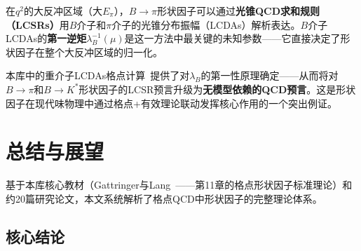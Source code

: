 \documentclass[12pt,a4paper]{ctexart}
\theoremstyle{definition}
\begin{document}
在$q^2$的大反冲区域（大$E_\pi$），$B \to \pi$形状因子可以通过\textbf{光锥QCD求和规则（LCSRs）}用$B$介子和$\pi$介子的光锥分布振幅（LCDAs）解析表达。$B$介子LCDAs的\textbf{第一逆矩}$\lambda_B^{-1}(\mu)$是这一方法中最关键的未知参数——它直接决定了形状因子在整个大反冲区域的归一化。

本库中的重介子LCDAs格点计算~\cite{HeavyMesonLCDAs}提供了对$\lambda_B$的第一性原理确定——从而将对$B\to\pi$和$B\to K^*$形状因子的LCSR预言升级为\textbf{无模型依赖的QCD预言}。这是形状因子在现代味物理中通过格点+有效理论联动发挥核心作用的一个突出例证。

\section{总结与展望}

基于本库核心教材（Gattringer与Lang~\cite{GattringerLang2010}——第11章的格点形状因子标准理论）和约20篇研究论文，本文系统解析了格点QCD中形状因子的完整理论体系。

\subsection*{核心结论}
\end{document}
